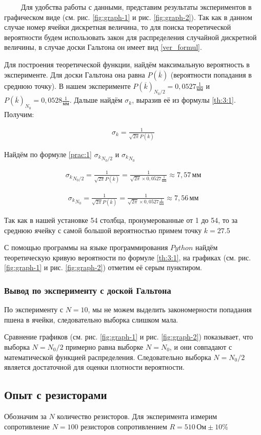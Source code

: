 $\qquad$ Для удобства работы с данными, представим результаты экспериментов в графическом виде (см. рис. \ref{fig:graph-1} и рис. \ref{fig:graph-2}). Так как в данном случае номер ячейки дискретная величина, то для поиска теоретической вероятности будем использовать закон для распределения случайной дискретной величины, в случае доски Гальтона он имеет вид \eqref{ver_formul}.

Для построения теоретической функции, найдём максимальную вероятность в эксперименте. Для доски Гальтона она равна $P(\overline{k})$ (вероятности попадания в среднюю точку). В нашем эксперименте $P(\overline{k})_{N_0/2} = 0,0527 \frac{1}{\text{мм}}$ и $P(\overline{k})_{N_0} = 0,0528 \frac{1}{\text{мм}}$. Дальше найдём $\sigma_k$, выразив её из формулы \eqref{th:3:1}. Получим:

\begin{align} \label{prac:1}
	\sigma_k = \frac{1}{\sqrt{2 \pi} P(\overline{k})} 
\end{align}

Найдём по формуле \eqref{prac:1} ${\sigma_k}_{N_0/2}$ и ${\sigma_k}_{N_0}$ 

\begin{align*}
	{\sigma_k}_{N_0/2} = \frac{1}{\sqrt{2 \pi} P(\overline{k})} = \frac{1}{\sqrt{2 \pi} \times 0,0527 \frac{1}{\text{мм}}} \approx 7,57 \, \text{мм}
\end{align*}

\begin{align*}
	{\sigma_k}_{N_0} = \frac{1}{\sqrt{2 \pi} P(\overline{k})} = \frac{1}{\sqrt{2 \pi} \times 0,0527 \frac{1}{\text{мм}}} \approx 7,56 \, \text{мм}
\end{align*}

Так как в нашей установке 54 столбца, пронумерованные от 1 до 54, то за среднюю ячейку с самой большой вероятностью примем точку $k = 27.5$ 

С помощью программы на языке программирования $Python$ найдём теоретическую кривую вероятности по формуле \eqref{th:3:1}, на графиках (см. рис. \ref{fig:graph-1} и рис. \ref{fig:graph-2}) отметим её серым пунктиром.

\subsubsection{Вывод по эксперименту с доской Гальтона}

По эксперименту с $N = 10$, мы не можем выделить закономерности попадания пшена в ячейки, следовательно выборка слишком мала. 

Сравнение графиков (см. рис. \ref{fig:graph-1} и рис. \ref{fig:graph-2}) показывает, что выборка $N = N_0/2$ примерно равна выборке $N = N_0$, и они совпадают с математической функцией распределения. Следовательно выборка $N = N_0/2$ является достаточной для оценки плотности вероятности.

\subsection{Опыт с резисторами}

Обозначим за $N$ количество резисторов. Для эксперимента измерим сопротивление $N = 100$ резисторов сопротивлением   $R = 510\,\text{Ом}\pm10\%$

